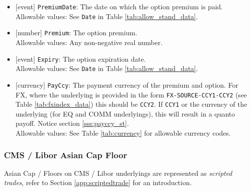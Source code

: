 \begin{itemize}
  Allowable values: See \lstinline!Date! in Table \ref{tab:allow_stand_data}.
  \item{}[event] \lstinline!PremiumDate!: The date on which the option premium is paid. \\
  Allowable values: See \lstinline!Date! in Table \ref{tab:allow_stand_data}.
  \item{}[number] \lstinline!Premium!: The option premium. \\
  Allowable values: Any non-negative real number.
  \item{}[event] \lstinline!Expiry!: The option expiration date. \\
  Allowable values: See \lstinline!Date! in Table \ref{tab:allow_stand_data}.
  \item{}[currency] \lstinline!PayCcy!: The payment currency of the premium and option. For FX, where the underlying is provided
      in the form \lstinline!FX-SOURCE-CCY1-CCY2! (see Table \ref{tab:fxindex_data}) this should
      be \lstinline!CCY2!. If \lstinline!CCY1! or the currency of the underlying (for EQ and
      COMM underlyings), this will result in a quanto payoff. Notice section \ref{sss:payccy_st}. \\
        Allowable values: See Table \ref{tab:currency} for allowable currency codes.
\end{itemize}

\subsubsection{CMS / Libor Asian Cap Floor}


Asian Cap / Floors on CMS / Libor underlyings are represented as {\em scripted trades}, refer to Section
\ref{app:scriptedtrade} for an introduction.

